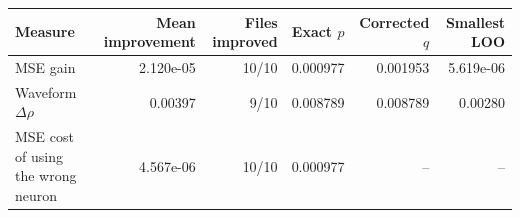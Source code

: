 \begin{tabular}{@{}lrrrrr@{}}
\toprule
Measure & Mean improvement & Files improved & Exact $p$ & Corrected $q$ & Smallest LOO \\
\midrule
MSE gain & 2.120e-05 & 10/10 & 0.000977 & 0.001953 & 5.619e-06 \\
Waveform $\Delta\rho$ & 0.00397 & 9/10 & 0.008789 & 0.008789 & 0.00280 \\
\midrule
MSE cost of using the wrong neuron & 4.567e-06 & 10/10 & 0.000977 & -- & -- \\
\bottomrule
\end{tabular}
